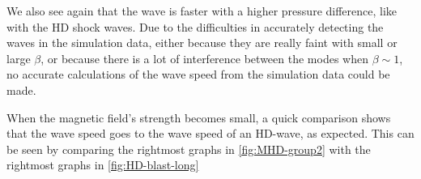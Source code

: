 We also see again that the wave is faster with a higher pressure difference, like with the HD shock waves. 
Due to the difficulties in accurately detecting the waves in the simulation data, either because they are really faint with small or large $\beta$, or because there is a lot of interference between the modes when $\beta \sim 1$, no accurate calculations of the wave speed from the simulation data could be made.

When the magnetic field's strength becomes small, a quick comparison shows that the wave speed goes to the wave speed of an HD-wave, as expected.
This can be seen by comparing the rightmost graphs in \cref{fig:MHD-group2} with the rightmost graphs in \cref{fig:HD-blast-long}

